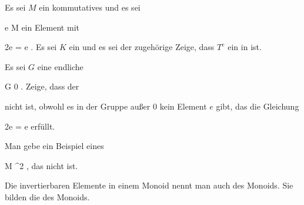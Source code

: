 {}
{





Es sei $M$ ein kommutatives
und es sei

\mavergleichskette
{\vergleichskette
{ e
}
{ \in }{ M
}
{  }{
}
{    }{
}
{   }{
}
}
{}{}{}
ein Element mit

\mavergleichskette
{\vergleichskette
{ 2e
}
{ = }{ e
}
{  }{
}
{    }{
}
{   }{
}
}
{}{}{.}
Es sei $K$ ein
und es sei
 der zugehörige
Zeige, dass $T^e$ ein
in
 ist.





}
{} {}

{}
{





Es sei $G$ eine endliche

\mavergleichskette
{\vergleichskette
{G
}
{ \neq }{ 0
}
{  }{
}
{    }{
}
{   }{
}
}
{}{}{.}
Zeige, dass der

 nicht
ist, obwohl es in der Gruppe außer $0$ kein Element $e$ gibt, das die Gleichung

\mavergleichskette
{\vergleichskette
{ 2e
}
{ = }{ e
}
{  }{
}
{    }{
}
{   }{
}
}
{}{}{}
erfüllt.





}
{} {}

{}
{





Man gebe ein Beispiel eines

\mavergleichskette
{\vergleichskette
{ M
}
{ \subseteq }{ \N^2
}
{  }{
}
{    }{
}
{   }{
}
}
{}{}{,}
das nicht
ist.





}
{} {}

Die invertierbaren Elemente in einem Monoid nennt man auch  des Monoids. Sie bilden die  des Monoids.

